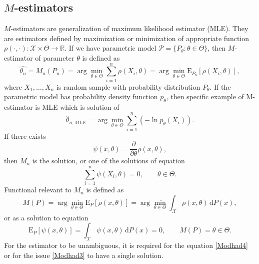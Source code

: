 \subsection{$M$-estimators}
$M$-estimators are generalization of maximum likelihood estimator (MLE). They are estimators defined by maximization or minimization of appropriate function $\rho(\cdot,\cdot):\mathcal{X}\times \Theta \rightarrow \mathbb{R}$. If we have parametric model $\mathcal{P} = \lbrace P_\theta : \theta \in \Theta\rbrace$, then $M$-estimator of parameter $\theta$ is defined as 
\begin{equation}
	\hat{\theta_n} = M_n(P_n) = \arg \min_{\theta \in \Theta} \sum_{i=1}^n \rho(X_i,\theta) = \arg \min_{\theta \in \Theta} \mathrm{E}_{P_n}\left[ \rho(X_i,\theta) \right],
	\label{Modhad1}
\end{equation}
where $X_1,\ldots,X_n$ is random sample with probability distribution  $P_\theta$. If the parametric model has probability density function $p_\theta$, then specific example of M-estimator is MLE which is solution of
\begin{equation}
	\hat{\theta}_{n, MLE} = \arg\min_{\theta \in \Theta} \sum_{i=1}^n \left( -\ln p_\theta(X_i)\right).
\end{equation}
If there exists
\begin{equation}
	\psi(x,\theta) = \frac{\partial}{\partial \theta} \rho(x,\theta), 
\end{equation}
then $M_n$ is the solution, or one of the solutions of equation 
\begin{equation}
	\sum_{i=1}^n \psi(X_i,\theta) = 0, \qquad \theta \in \Theta.
	\label{Modhad2}
\end{equation}
Functional relevant to $M_n$ is defined as 
\begin{equation}
	M(P) = \arg \min_{\theta \in \Theta} \mathrm{E}_{P}\left[ \rho(x,\theta) \right] = \arg \min_{\theta \in \Theta} \int_\mathcal{X} \rho(x,\theta) \, \mathrm{d}P(x),
	\label{Modhad3}
\end{equation}
or as a solution to equation 
\begin{equation}
\mathrm{E}_{P}\left[ \psi(x,\theta) \right] =  \int_\mathcal{X} \psi(x,\theta) \, \mathrm{d}P(x) = 0, \qquad M(P) = \theta \in \Theta.
\label{Modhad4}
\end{equation}
For the estimator to be unambiguous, it is required for the equation \ref{Modhad4} or for the issue  \ref{Modhad3} to have a single solution.

